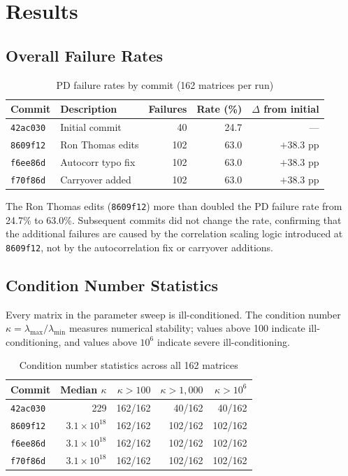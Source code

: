 \documentclass[11pt]{article}
\begin{document}
\section{Results}

\subsection{Overall Failure Rates}

\begin{table}[h]
\centering
\caption{PD failure rates by commit (162 matrices per run)}
\begin{tabular}{llrrr}
\toprule
Commit & Description & Failures & Rate (\%) &
  $\Delta$ from initial \\
\midrule
\texttt{42ac030} & Initial commit &
  40 & 24.7 & --- \\
\texttt{8609f12} & Ron Thomas edits &
  102 & 63.0 & $+38.3$ pp \\
\texttt{f6ee86d} & Autocorr typo fix &
  102 & 63.0 & $+38.3$ pp \\
\texttt{f70f86d} & Carryover added &
  102 & 63.0 & $+38.3$ pp \\
\bottomrule
\end{tabular}
\label{tab:rates}
\end{table}

The Ron Thomas edits (\texttt{8609f12}) more than doubled the
PD failure rate from 24.7\% to 63.0\%. Subsequent commits did
not change the rate, confirming that the additional failures are
caused by the correlation scaling logic introduced at
\texttt{8609f12}, not by the autocorrelation fix or carryover
additions.

\subsection{Condition Number Statistics}

Every matrix in the parameter sweep is ill-conditioned. The
condition number $\kappa = \lambda_{\max} / \lambda_{\min}$
measures numerical stability; values above 100 indicate
ill-conditioning, and values above $10^6$ indicate severe
ill-conditioning.

\begin{table}[h]
\centering
\caption{Condition number statistics across all 162 matrices}
\begin{tabular}{lrrrr}
\toprule
Commit & Median $\kappa$ & $\kappa > 100$ &
  $\kappa > 1{,}000$ & $\kappa > 10^6$ \\
\midrule
\texttt{42ac030} & 229 & 162/162 & 40/162 & 40/162 \\
\texttt{8609f12} & $3.1 \times 10^{18}$ &
  162/162 & 102/162 & 102/162 \\
\texttt{f6ee86d} & $3.1 \times 10^{18}$ &
  162/162 & 102/162 & 102/162 \\
\texttt{f70f86d} & $3.1 \times 10^{18}$ &
  162/162 & 102/162 & 102/162 \\
\bottomrule
\end{tabular}
\end{table}
\end{document}
